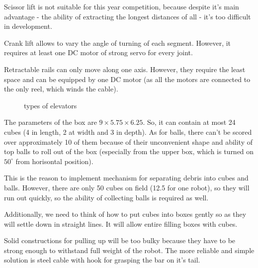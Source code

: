 \begin{enumerate*}
		Scissor lift is not suitable for this year competition, because despite it's main advantage - the ability of extracting the longest distances of all - it's too difficult in development.
		
		Crank lift allows to vary the angle of turning of each segment. However, it requires at least one DC motor of strong servo for every joint.
		
		Retractable rails can only move along one axis. However, they require the least space and can be equipped by one DC motor (as all the motors are connected to the only reel, which winds the cable).
		\begin{figure}[H]
			\begin{minipage}[h]{1\linewidth}
				\caption{types of elevators}
				\label{types_of_lifts}
			\end{minipage}
		\end{figure}
		\item The parameters of the box are $9\times5.75\times6.25$. So, it can contain at most 24 cubes (4 in length, 2 at width and 3 in depth). As for balls, there can't be scored over approximately 10 of them because of their unconvenient shape and ability of top balls to roll out of the box (especially from the upper box, which is turned on $50^{\circ}$ from horisontal position).
		
		This is the reason to implement mechanism for separating debris into cubes and balls. However, there are only 50 cubes on field (12.5 for one robot), so they will run out quickly, so the ability of collecting balls is required as well.
		
		Additionally, we need to think of how to put cubes into boxes gently so as they will settle down in straight lines. It will allow entire filling boxes with cubes.\newline
		\item Solid constructions for pulling up will be too bulky because they have to be strong enough to withstand full weight of the robot. The more reliable and simple solution is steel cable with hook for grasping the bar on it's tail.
		

\end{enumerate*}
